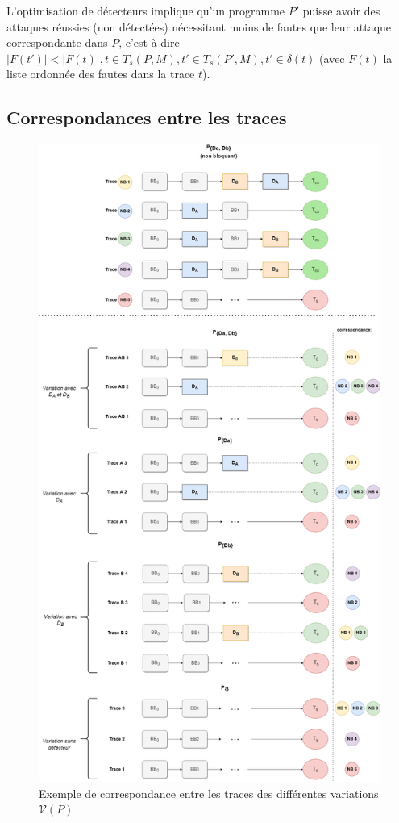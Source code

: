             L'optimisation de détecteurs implique qu'un programme $P'$ puisse avoir des attaques réussies (non détectées) nécessitant moins de fautes que leur attaque correspondante dans $P$, c'est-à-dire $|F(t')| < |F(t)|, t \in T_s(P, M), t' \in T_s(P', M), t' \in \delta(t)$ (avec $F(t)$ la liste ordonnée des fautes dans la trace $t$). 

        \subsection{Correspondances entre les traces}          
        \label{sec:ccpo-trace-match}
            
            \begin{figure}[htbp]
            \centering
                \includegraphics[scale=0.27]{ch6-ccpo/img/trace-corresp.drawio.png}
            \caption{Exemple de correspondance entre les traces des différentes variations $\mathcal{V}(P)$}
            \label{fig:ch6:trace-corresp}
            \end{figure}

